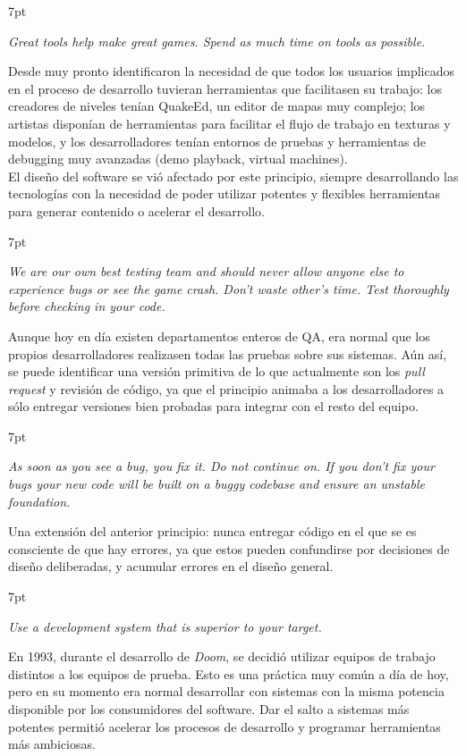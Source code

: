 \documentclass[a4paper,12pt]{report}
\newenvironment{formal}{%
	\def\FrameCommand{%
		\hspace{1pt}%
		{\color{darkblue}\vrule width 2pt}%
		{\color{formalshade}\vrule width 4pt}%
		\colorbox{formalshade}%
	}%
	\MakeFramed{\advance\hsize-\width\FrameRestore}%
	\noindent\hspace{-4.55pt}%
	\begin{adjustwidth}{}{7pt}%
		\vspace{2pt}\vspace{2pt}%
	}
	{%
		\vspace{2pt}\end{adjustwidth}\endMakeFramed%
}
\begin{document}
	\begin{formal}
		\textit{Great tools help make great games. Spend as much time on tools as possible.}      
	\end{formal}
	Desde muy pronto identificaron la necesidad de que todos los usuarios implicados en el proceso de desarrollo tuvieran herramientas que facilitasen su trabajo: los creadores de niveles tenían QuakeEd, un editor de mapas muy complejo; los artistas disponían de herramientas para facilitar el flujo de trabajo en texturas y modelos, y los desarrolladores tenían entornos de pruebas y herramientas de debugging muy avanzadas (demo playback, virtual machines).\\
	El diseño del software se vió afectado por este principio, siempre desarrollando las tecnologías con la necesidad de poder utilizar potentes y flexibles herramientas para generar contenido o acelerar el desarrollo.
	
	\begin{formal}
		\textit{We are our own best testing team and should never allow anyone else to experience bugs or see the game crash. Don't waste other's time. Test thoroughly before checking in your code.}        
	\end{formal}
	Aunque hoy en día existen departamentos enteros de QA, era normal que los propios desarrolladores realizasen todas las pruebas sobre sus sistemas. Aún así, se puede identificar una versión primitiva de lo que actualmente son los \textit{pull request} y revisión de código, ya que el principio animaba a los desarrolladores a sólo entregar versiones bien probadas para integrar con el resto del equipo.
	
	\begin{formal}
		\textit{As soon as you see a bug, you fix it. Do not continue on. If you don't fix your bugs your new code will be built on a buggy codebase and ensure an unstable foundation.}        
	\end{formal}
	Una extensión del anterior principio: nunca entregar código en el que se es consciente de que hay errores, ya que estos pueden confundirse por decisiones de diseño deliberadas, y acumular errores en el diseño general.
	
	\begin{formal}
		\textit{Use a development system that is superior to your target.}       
	\end{formal}
	En 1993, durante el desarrollo de \textit{Doom}, se decidió utilizar equipos de trabajo distintos a los equipos de prueba. Esto es una práctica muy común a día de hoy, pero en su momento era normal desarrollar con sistemas con la misma potencia disponible por los consumidores del software. Dar el salto a sistemas más potentes permitió acelerar los procesos de desarrollo y programar herramientas más ambiciosas.
	
\end{document}
